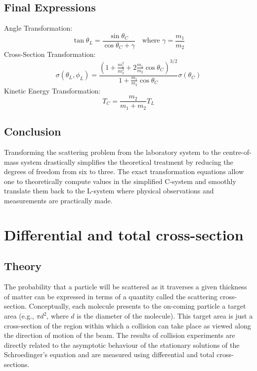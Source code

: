 \documentclass[12pt]{report}
\begin{document}
\subsection*{Final Expressions}
Angle Transformation:
\begin{equation}
\boxed{ \tan \theta_L = \frac{\sin \theta_C}{\cos \theta_C + \gamma} \quad \text{where } \gamma = \frac{m_1}{m_2} }
\end{equation}
Cross-Section Transformation:
\begin{equation}
\boxed{ \sigma(\theta_L, \phi_L) = \frac{\left( 1 + \frac{m_1^2}{m_2^2} + 2 \frac{m_1}{m_2} \cos \theta_C \right)^{3/2}}{1 + \frac{m_1}{m_2} \cos \theta_C} \sigma(\theta_C) }
\end{equation}
Kinetic Energy Transformation:
\begin{equation}
\boxed{ T_C = \frac{m_2}{m_1 + m_2} T_L }
\end{equation}

\subsection*{Conclusion}
Transforming the scattering problem from the laboratory system to the centre-of-mass system drastically simplifies the theoretical treatment by reducing the degrees of freedom from six to three. The exact transformation equations allow one to theoretically compute values in the simplified C-system and smoothly translate them back to the L-system where physical observations and measurements are practically made.


\section{Differential and total cross-section}



\subsection*{Theory}
The probability that a particle will be scattered as it traverses a given thickness of matter can be expressed in terms of a quantity called the scattering cross-section. Conceptually, each molecule presents to the on-coming particle a target area (e.g., $\pi d^2$, where $d$ is the diameter of the molecule). This target area is just a cross-section of the region within which a collision can take place as viewed along the direction of motion of the beam. The results of collision experiments are directly related to the asymptotic behaviour of the stationary solutions of the Schroedinger's equation and are measured using differential and total cross-sections.
\end{document}
